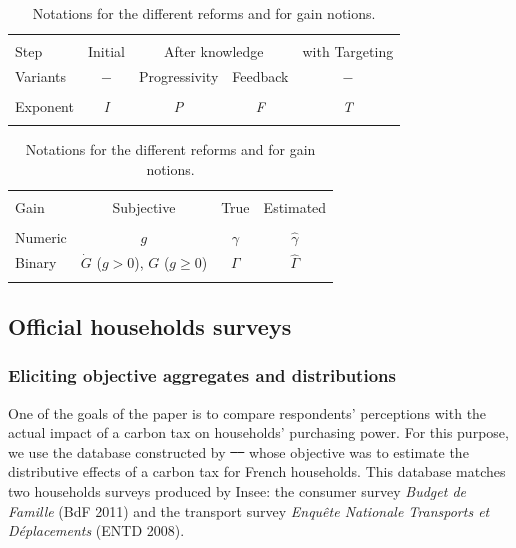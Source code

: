 \documentclass[12pt]{article} %
\providecommand{\DIFaddtex}[1]{{\protect\color{blue}\uwave{#1}}} %
\providecommand{\DIFdeltex}[1]{{\protect\color{red}\sout{#1}}}                      %
\providecommand{\DIFaddbegin}{} %
\providecommand{\DIFaddend}{} %
\providecommand{\DIFdelbegin}{} %
\providecommand{\DIFdelend}{} %
\providecommand{\DIFadd}[1]{\texorpdfstring{\DIFaddtex{#1}}{#1}} %
\providecommand{\DIFdel}[1]{\texorpdfstring{\DIFdeltex{#1}}{}} %
\newcommand{\DIFscaledelfig}{0.5}
\newlength{\DIFdelgraphicswidth} %
\newlength{\DIFdelgraphicsheight} %
\newcommand{\DIFaddincludegraphics}[2][]{{\color{blue}\fbox{\DIFOincludegraphics[#1]{#2}}}} %
\newcommand{\DIFdelincludegraphics}[2][]{%
\sbox{\DIFdelgraphicsbox}{\DIFOincludegraphics[#1]{#2}}%
\settoboxwidth{\DIFdelgraphicswidth}{\DIFdelgraphicsbox} %
\settoboxtotalheight{\DIFdelgraphicsheight}{\DIFdelgraphicsbox} %
\scalebox{\DIFscaledelfig}{%
\parbox[b]{\DIFdelgraphicswidth}{\usebox{\DIFdelgraphicsbox}\\[-\baselineskip] \rule{\DIFdelgraphicswidth}{0em}}\llap{\resizebox{\DIFdelgraphicswidth}{\DIFdelgraphicsheight}{%
\setlength{\unitlength}{\DIFdelgraphicswidth}%
\begin{picture}(1,1)%
\thicklines\linethickness{2pt} %
{\color[rgb]{1,0,0}\put(0,0){\framebox(1,1){}}}%
{\color[rgb]{1,0,0}\put(0,0){\line( 1,1){1}}}%
{\color[rgb]{1,0,0}\put(0,1){\line(1,-1){1}}}%
\end{picture}%
}\hspace*{3pt}}} %
} %
\DeclareRobustCommand{\DIFaddbegin}{\DIFOaddbegin \let\includegraphics\DIFaddincludegraphics} %
\DeclareRobustCommand{\DIFaddend}{\DIFOaddend \let\includegraphics\DIFOincludegraphics} %
\DeclareRobustCommand{\DIFdelbegin}{\DIFOdelbegin \let\includegraphics\DIFdelincludegraphics} %
\DeclareRobustCommand{\DIFdelend}{\DIFOaddend \let\includegraphics\DIFOincludegraphics} %
\begin{document}

\begin{table}[H]
\caption{Notations for the different reforms and for gain notions.}
\label{tab:notations}

\centering \begin{tabular}{lcccc}
\\[-1.8ex]\hline 
\hline\\[-2.6ex] Step & Initial & \multicolumn{2}{c}{After knowledge} & with Targeting\tabularnewline

Variants & $-$ & Progressivity & Feedback & $-$\tabularnewline
 \hline \\[-2.3ex] 
Exponent & \emph{I} & \emph{P} & \emph{F} & \emph{T} \\ 
\hline 
\hline \\[-1.8ex] 
\end{tabular}

\medskip

\centering \begin{tabular}{lccc}
\\[-1.8ex]\hline 
\hline \\[-2.6ex] 
Gain & Subjective & True & Estimated\tabularnewline
 \hline \\[-2.3ex] 
Numeric & $g$ & $\gamma$ & $\widehat{\gamma}$\tabularnewline
Binary & $\dot{G}$ ($g>0$), $G$ ($g\geq0$) & $\Gamma$ & $\widehat{\Gamma}$ \\ 
\hline 
\hline \\[-1.8ex] 
\end{tabular}

\end{table}

\subsection{Official households surveys\label{subsec:Households-surveys}}

    \subsubsection{Eliciting objective aggregates and distributions \label{subsubsec:comparing-obj-subj}}
\DIFaddbegin 

\DIFaddend %
One of the goals of the paper is to compare respondents' perceptions with the actual impact of a carbon tax on households' purchasing power. For this purpose, we use the database constructed by \DIFdelbegin \DIFdel{\mbox{%
\citet{douenne_vertical_2018} }\hspace{0pt}%
}\DIFdelend \DIFaddbegin \DIFadd{\mbox{%
\citet{douenne_2020} }\hspace{0pt}%
}\DIFaddend whose objective was to estimate the distributive effects of a carbon tax for French households. This database matches two households surveys produced by Insee: the consumer survey \emph{Budget de Famille} (BdF 2011) and the transport survey \emph{Enquête Nationale Transports et Déplacements} (ENTD 2008).
\end{document}
